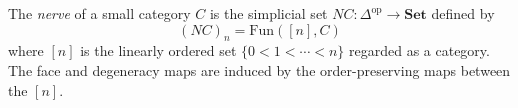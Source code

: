 The \emph{nerve} of a small category $C$ is the simplicial set $NC: \Delta^{\mathrm{op}} \to \mathbf{Set}$ defined by
$$(NC)_n = \mathrm{Fun}([n], C)$$
where $[n]$ is the linearly ordered set $\{0 < 1 < \cdots < n\}$ regarded as a category. The face and degeneracy maps are induced by the order-preserving maps between the $[n]$.
